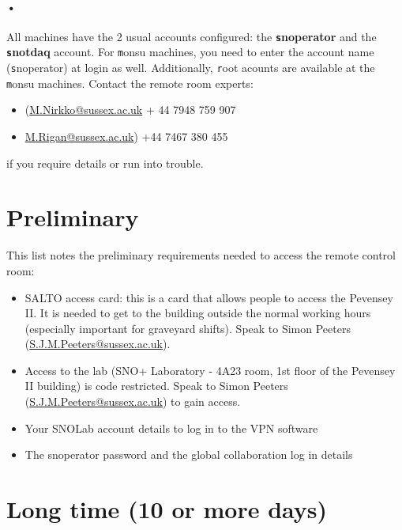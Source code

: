\documentclass[12pt, oneside, a4paper]{article}
\begin{document}
\paragraph{•}
All machines have the 2 usual accounts configured: the \textbf{\texttt snoperator} and the \textbf{\texttt snotdaq} account. For {\texttt monsu} machines, you need to enter the account name ({\texttt snoperator}) at login as well. Additionally, {\texttt root} acounts are available at the {\texttt monsu} machines. Contact the remote room experts:
\begin{itemize}
\item (\href{mailto:M.Nirkko@sussex.ac.uk}{M.Nirkko@sussex.ac.uk} + 44 7948 759 907
\item \href{mailto:M.Rigan@sussex.ac.uk}{M.Rigan@sussex.ac.uk})  +44 7467 380 455
\end{itemize}
if you require details or run into trouble.

\section{Preliminary}
This list notes the preliminary requirements needed to access the remote control room:
\begin{itemize}
	\item SALTO access card: this is a card that allows people to access the Pevensey II. It is needed to get to the building outside the normal working hours (especially important for graveyard shifts). Speak to Simon Peeters (\href{mailto:S.J.M.Peeters@sussex.ac.uk}{S.J.M.Peeters@sussex.ac.uk}).
	\item Access to the lab (SNO+ Laboratory - 4A23 room, 1st floor of the Pevensey II building) is code restricted.  Speak to Simon Peeters \newline (\href{mailto:S.J.M.Peeters@sussex.ac.uk}{S.J.M.Peeters@sussex.ac.uk}) to gain access.
	\item Your SNOLab account details to log in to the VPN software
	\item The snoperator password and the global collaboration log in details
\end{itemize}

\section{Long time (10 or more days)}
\end{document}

